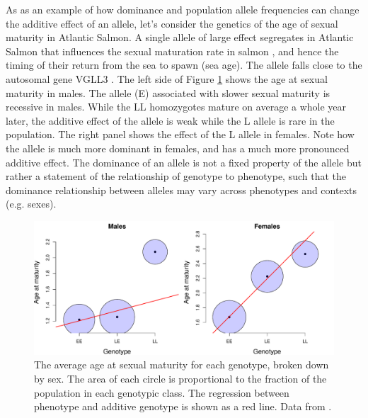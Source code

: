 As as an example of how dominance and population allele frequencies can change the additive effect of an allele, let's consider the genetics of the age of sexual maturity in Atlantic Salmon. A single allele of large effect segregates in Atlantic Salmon that influences the sexual maturation rate in salmon \citep{ayllon2015vgll3,barson2015sex}, and hence the timing of their return from the sea to spawn (sea age). The allele falls close to the autosomal gene VGLL3 \citep[variation at this gene in humans also influences the timing of puberty]{cousminer2013genome}. The left side of Figure \ref{fig:salmon_add_dom} shows the age at  sexual maturity in males. The allele (E) associated with slower sexual maturity is recessive in males. While the LL homozygotes mature on average a whole year later, the additive effect of the allele is weak while the L allele is rare in the population. The right panel shows the effect of the L allele in females. Note how the allele is much more dominant in females, and has a much more pronounced additive effect. The dominance of an allele is not a fixed property of the allele but rather a statement of the relationship of genotype to phenotype, such that the dominance relationship between alleles may vary across phenotypes and contexts (e.g. sexes). %



\begin{figure}
\begin{center}
\includegraphics[width=\textwidth]{Journal_figs/Quant_gen/salmon_age/Salmon_age_dom.pdf}
\end{center}
\caption{The average age at sexual maturity for each genotype, broken
  down by sex. 
The area of each circle is proportional to the fraction of
the population in each genotypic class. The regression between phenotype and additive genotype is
  shown as a red line. Data from \citet{barson2015sex}.} \label{fig:salmon_add_dom} %
\end{figure}

